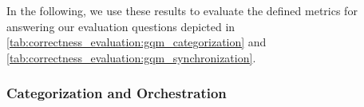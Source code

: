 In the following, we use these results to evaluate the defined metrics for answering our evaluation questions depicted in \autoref{tab:correctness_evaluation:gqm_categorization} and \autoref{tab:correctness_evaluation:gqm_synchronization}.








\subsubsection{Categorization and Orchestration}

